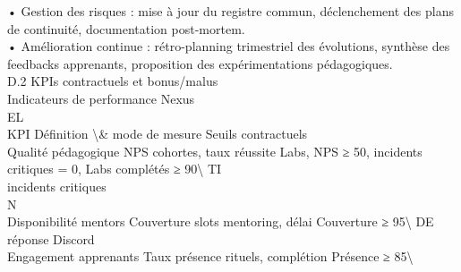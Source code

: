 \documentclass[12pt,landscape,a4paper]{article}
\begin{document}
\vspace{0.5em}
• Gestion des risques : mise à jour du registre commun, déclenchement des plans de continuité, documentation post-mortem.\\
\vspace{0.5em}
• Amélioration continue : rétro-planning trimestriel des évolutions, synthèse des feedbacks apprenants, proposition des expérimentations pédagogiques.\\
\vspace{0.5em}
\vspace{0.5em}
\vspace{0.5em}
D.2 KPIs contractuels et bonus/malus\\
Indicateurs de performance Nexus\\
\vspace{0.5em}
\vspace{0.5em}
\vspace{0.5em}
\vspace{0.5em}
EL\\
KPI                           Définition \textbackslash{}& mode de mesure            Seuils contractuels\\
Qualité pédagogique           NPS cohortes, taux réussite Labs,      NPS ≥ 50, incidents critiques = 0, Labs complétés ≥ 90\textbackslash{}%
\vspace{0.5em}
\vspace{0.5em}
\vspace{0.5em}
\vspace{0.5em}
TI\\
incidents critiques\\
\vspace{0.5em}
\vspace{0.5em}
\vspace{0.5em}
\vspace{0.5em}
N\\
Disponibilité mentors         Couverture slots mentoring, délai      Couverture ≥ 95\textbackslash{}%
\vspace{0.5em}
\vspace{0.5em}
\vspace{0.5em}
\vspace{0.5em}
DE\\
réponse Discord\\
Engagement apprenants         Taux présence rituels, complétion      Présence ≥ 85\textbackslash{}%
\end{document}
